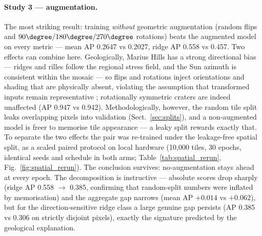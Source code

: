 \paragraph{Study 3 --- augmentation.}
The most striking result: training \emph{without} geometric augmentation (random flips and $90\degree/180\degree/270\degree$ rotations) beats the augmented model on every metric --- mean AP 0.2647 vs 0.2027, ridge AP 0.558 vs 0.457. Two effects can combine here. Geologically, Marius Hills has a strong directional bias --- ridges and rilles follow the regional stress field, and the Sun azimuth is consistent within the mosaic --- so flips and rotations inject orientations and shading that are physically absent, violating the assumption that transformed inputs remain representative \citep{shorten2019augmentation}; rotationally symmetric craters are indeed unaffected (AP 0.947 vs 0.942). Methodologically, however, the random tile split leaks overlapping pixels into validation (Sect.~\ref{sec:splits}), and a non-augmented model is freer to memorise tile appearance --- a leaky split rewards exactly that. To separate the two effects the pair was re-trained under the leakage-free spatial split, as a scaled paired protocol on local hardware (10{,}000 tiles, 30 epochs, identical seeds and schedule in both arms; Table~\ref{tab:spatial_rerun}, Fig.~\ref{fig:spatial_rerun}). The conclusion survives: no-augmentation stays ahead at every epoch. The decomposition is instructive --- absolute scores drop sharply (ridge AP 0.558 $\to$ 0.385, confirming that random-split numbers were inflated by memorisation) and the aggregate gap narrows (mean AP $+0.014$ vs $+0.062$), but for the direction-sensitive ridge class a large genuine gap persists (AP 0.385 vs 0.306 on strictly disjoint pixels), exactly the signature predicted by the geological explanation.

\begin{table}[htbp]
\centering
\caption{Best result from each ablation study (full T4 protocol, 30 epochs; random tile split).}
\label{tab:final_summary}
\end{table}

